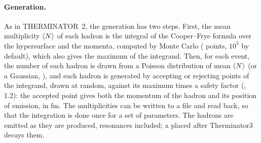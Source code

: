 \paragraph{Generation.}
As in THERMINATOR~2, the generation has two steps. First, the mean multiplicity $\left\langle N \right\rangle$ of each hadron is the
integral of the Cooper--Frye formula over the hypersurface and the momenta, computed by Monte Carlo
( points, $10^5$ by default), which also gives the maximum of the integrand. Then, for each event, the
number of each hadron is drawn from a Poisson distribution of mean $\left\langle N \right\rangle$ (or a Gaussian, ),
and each hadron is generated by accepting or rejecting points of the integrand, drawn at random, against its maximum
times a safety factor (, 1.2): the accepted point gives both the momentum of the hadron and
its position of emission, in fm. The multiplicities can be written to a file and read back, so that the integration
is done once for a set of parameters. The hadrons are emitted as they are produced, resonances included; a
 placed after Therminator3 decays them.

